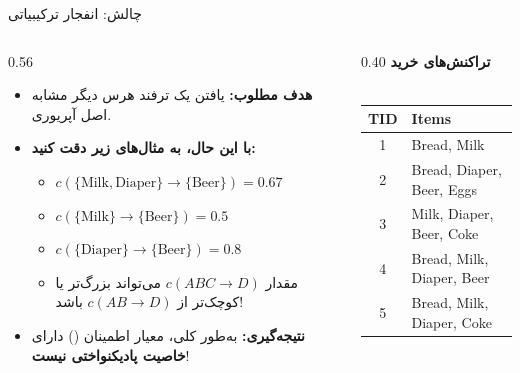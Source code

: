 \begin{frame}{چالش: انفجار ترکیبیاتی}{}
\begin{columns}[T,onlytextwidth]
\begin{column}{0.56\textwidth}
\begin{itemize}\setlength{\itemsep}{4pt}\small
    \item \textbf{هدف مطلوب:} یافتن یک ترفند هرس دیگر مشابه اصل آپریوری.
    \item \textbf{با این حال، به مثال‌های زیر دقت کنید:}
    \begin{itemize}\footnotesize
        \item $c(\{\text{Milk}, \text{Diaper}\} \to \{\text{Beer}\}) = 0.67$
        \item $c(\{\text{Milk}\} \to \{\text{Beer}\}) = 0.5$
        \item $c(\{\text{Diaper}\} \to \{\text{Beer}\}) = 0.8$
        \item مقدار $c(ABC \to D)$ می‌تواند بزرگ‌تر یا کوچک‌تر از $c(AB \to D)$ باشد!
    \end{itemize}
    \vspace{0.2cm}
    \item \alert{\textbf{نتیجه‌گیری:}} به‌طور کلی، معیار اطمینان () دارای \textbf{خاصیت پاد‌یکنواختی نیست}!
\end{itemize}
\end{column}%
\begin{column}{0.40\textwidth}
\centering
\textbf{\small تراکنش‌های خرید}\\[1pt]
{\scriptsize{}}\\[3pt]
\begin{latin}
\fontsize{7.5}{9.5}\selectfont
\begin{tabular}{|c|l|}
\hline
\rowcolor{mannheimblue!15}
\textbf{TID} & \textbf{Items} \\ \hline
1 & Bread, Milk \\ \hline
2 & Bread, Diaper, Beer, Eggs \\ \hline
3 & Milk, Diaper, Beer, Coke \\ \hline
4 & Bread, Milk, Diaper, Beer \\ \hline
5 & Bread, Milk, Diaper, Coke \\ \hline
\end{tabular}
\end{latin}
\end{column}
\end{columns}
\end{frame}

